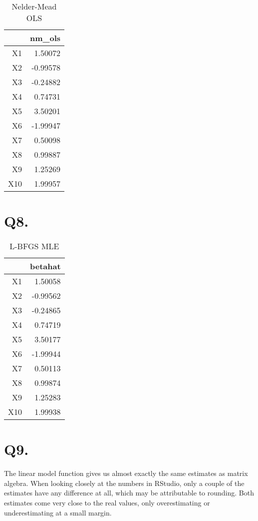 \documentclass{article}
\begin{document}
\begin{table}[H]
\centering
\caption{Nelder-Mead OLS} 
\begin{tabular}{rr}
  \hline
 & nm\_ols \\ 
  \hline
X1 & 1.50072 \\ 
  X2 & -0.99578 \\ 
  X3 & -0.24882 \\ 
  X4 & 0.74731 \\ 
  X5 & 3.50201 \\ 
  X6 & -1.99947 \\ 
  X7 & 0.50098 \\ 
  X8 & 0.99887 \\ 
  X9 & 1.25269 \\ 
  X10 & 1.99957 \\ 
   \hline
\end{tabular}
\end{table}

\section*{Q8.}

\begin{table}[H]
\centering
\caption{L-BFGS MLE} 
\begin{tabular}{rr}
  \hline
 & betahat \\ 
  \hline
X1 & 1.50058 \\ 
  X2 & -0.99562 \\ 
  X3 & -0.24865 \\ 
  X4 & 0.74719 \\ 
  X5 & 3.50177 \\ 
  X6 & -1.99944 \\ 
  X7 & 0.50113 \\ 
  X8 & 0.99874 \\ 
  X9 & 1.25283 \\ 
  X10 & 1.99938 \\ 
   \hline
\end{tabular}
\end{table}

\section*{Q9.}
The linear model function gives us almost exactly the same estimates as matrix algebra. When looking closely at the numbers in RStudio, only a couple of the estimates have any difference at all, which may be attributable to rounding. Both estimates come very close to the real values, only overestimating or underestimating at a small margin.
\end{document}
